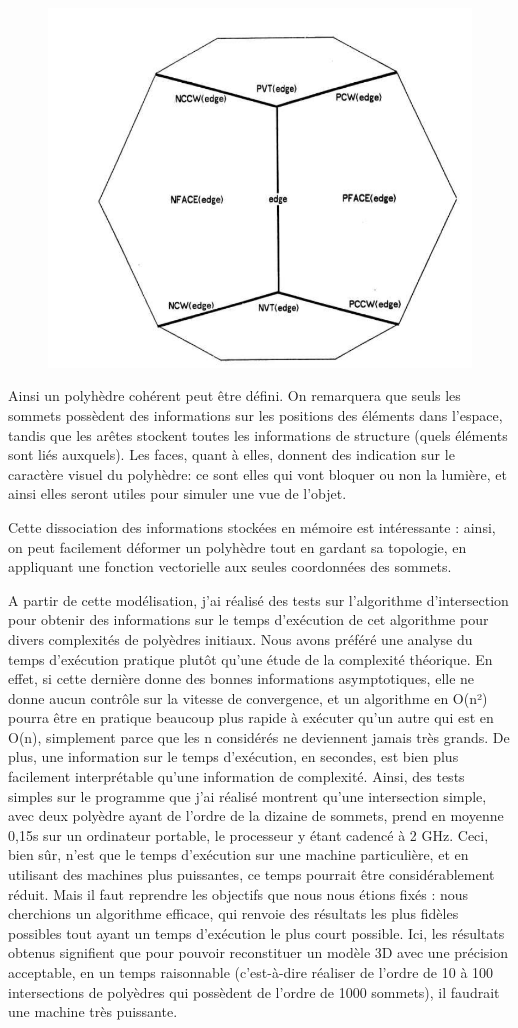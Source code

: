 \documentclass[a4paper]{article}
\begin{document}
      \begin{figure}
        \includegraphics[width=0.5\linewidth]{WEP}
        \centering
      \end{figure}

      Ainsi un polyhèdre cohérent peut être défini. On remarquera que seuls les sommets possèdent des informations sur les positions des éléments dans l'espace, tandis que les arêtes stockent toutes les informations de structure (quels éléments sont liés auxquels). Les faces, quant à elles, donnent des indication sur le caractère visuel du polyhèdre: ce sont elles qui vont bloquer ou non la lumière, et ainsi elles seront utiles pour simuler une vue de l'objet.

      Cette dissociation des informations stockées en mémoire est intéressante : ainsi, on peut facilement déformer un polyhèdre tout en gardant sa topologie, en appliquant une fonction vectorielle aux seules coordonnées des sommets. 

      A partir de cette modélisation, j’ai réalisé des tests sur l’algorithme d’intersection pour obtenir des informations sur le temps d’exécution de cet algorithme pour divers complexités de polyèdres initiaux. Nous avons préféré une analyse du temps d’exécution pratique plutôt qu’une étude de la complexité théorique. En effet, si cette dernière donne des bonnes informations asymptotiques, elle ne donne aucun contrôle sur la vitesse de convergence, et un algorithme en O(n²) pourra être en pratique beaucoup plus rapide à exécuter qu’un autre qui est en O(n), simplement parce que les n considérés ne deviennent jamais très grands. De plus, une information sur le temps d’exécution, en secondes, est bien plus facilement interprétable qu’une information de complexité. Ainsi, des tests simples sur le programme que j’ai réalisé montrent qu’une intersection simple, avec deux polyèdre ayant de l’ordre de la dizaine de sommets, prend en moyenne 0,15s sur un ordinateur portable, le processeur y étant cadencé à 2 GHz. Ceci, bien sûr, n’est que le temps d’exécution sur une machine particulière, et en utilisant des machines plus puissantes, ce temps pourrait être considérablement réduit. Mais il faut reprendre les objectifs que nous nous étions fixés : nous cherchions un algorithme efficace, qui renvoie des résultats les plus fidèles possibles tout ayant un temps d’exécution le plus court possible. Ici, les résultats obtenus signifient que pour pouvoir reconstituer un modèle 3D avec une précision acceptable, en un temps raisonnable (c’est-à-dire réaliser de l’ordre de 10 à 100 intersections de polyèdres qui possèdent de l’ordre de 1000 sommets), il faudrait une machine très puissante.
\end{document}
